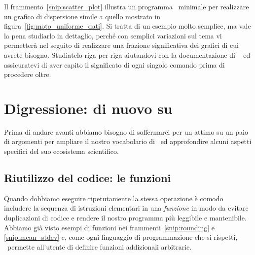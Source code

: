 Il frammento~\ref{snip:scatter_plot} illustra un programma \python\ minimale
per realizzare un grafico di dispersione simile a quello mostrato in
figura~\ref{fig:moto_uniforme_dati}. Si tratta di un esempio molto semplice,
ma vale la pena studiarlo in dettaglio, perché con semplici variazioni sul
tema vi permetterà nel seguito di realizzare una frazione significativa
dei grafici di cui avrete bisogno. Studiatelo riga per riga aiutandovi con
la documentazione di \matplotlib~\cite{matplotlibdoc} ed assicuratevi di aver
capito il significato di ogni singolo comando prima di procedere oltre.

\begin{snippet}[htb!]
  \bigskip %
\end{snippet}


\section{Digressione: di nuovo su \python}

Prima di andare avanti abbiamo bisogno di soffermarci per un attimo su un paio
di argomenti per ampliare il nostro vocabolario di \python\ ed approfondire
alcuni aspetti specifici del suo ecosistema scientifico.


\subsection{Riutilizzo del codice: le funzioni}

Quando dobbiamo eseguire ripetutamente la stessa operazione è comodo includere
la sequenza di istruzioni elementari in una \emph{funzione} in modo da evitare
duplicazioni di codice e rendere il nostro programma più leggibile e
mantenibile. Abbiamo già visto esempi di funzioni nei
frammenti~\ref{snip:rounding} e \ref{snip:mean_stdev} e, come ogni linguaggio di
programmazione che si rispetti, \python\ permette all'utente di definire
funzioni addizionali arbitrarie.

